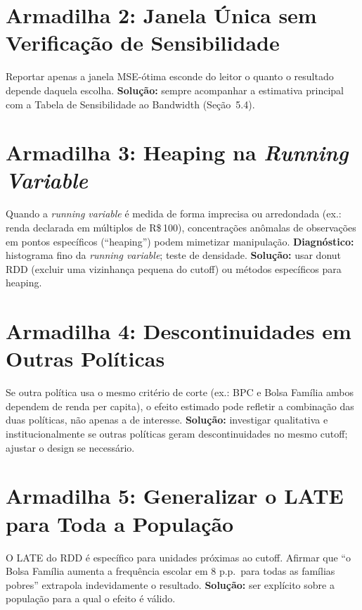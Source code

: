 \documentclass[12pt, a4paper, openany]{book}
\begin{document}
\section{Armadilha 2: Janela \'{U}nica sem Verifica\c{c}\~ao de Sensibilidade}

Reportar apenas a janela MSE-\'otima esconde do leitor o quanto o resultado depende daquela escolha. \textbf{Solu\c{c}\~ao:} sempre acompanhar a estimativa principal com a Tabela de Sensibilidade ao Bandwidth (Se\c{c}\~ao~5.4).

\section{Armadilha 3: Heaping na \textit{Running Variable}}

Quando a \textit{running variable} \'e medida de forma imprecisa ou arredondada (ex.: renda declarada em m\'ultiplos de R\$\,100), concentra\c{c}\~oes an\^omalas de observa\c{c}\~oes em pontos espec\'ificos (``heaping'') podem mimetizar manipula\c{c}\~ao. \textbf{Diagn\'ostico:} histograma fino da \textit{running variable}; teste de densidade. \textbf{Solu\c{c}\~ao:} usar donut RDD (excluir uma vizinhan\c{c}a pequena do cutoff) ou m\'etodos espec\'ificos para heaping.

\section{Armadilha 4: Descontinuidades em Outras Pol\'iticas}

Se outra pol\'itica usa o mesmo crit\'erio de corte (ex.: BPC e Bolsa Fam\'ilia ambos dependem de renda per capita), o efeito estimado pode refletir a combina\c{c}\~ao das duas pol\'iticas, n\~ao apenas a de interesse. \textbf{Solu\c{c}\~ao:} investigar qualitativa e institucionalmente se outras pol\'iticas geram descontinuidades no mesmo cutoff; ajustar o design se necess\'ario.

\section{Armadilha 5: Generalizar o LATE para Toda a Popula\c{c}\~ao}

O LATE do RDD \'e espec\'ifico para unidades pr\'oximas ao cutoff. Afirmar que ``o Bolsa Fam\'ilia aumenta a frequ\^encia escolar em 8 p.p.\ para todas as fam\'ilias pobres'' extrapola indevidamente o resultado. \textbf{Solu\c{c}\~ao:} ser expl\'icito sobre a popula\c{c}\~ao para a qual o efeito \'e v\'alido.
\end{document}
